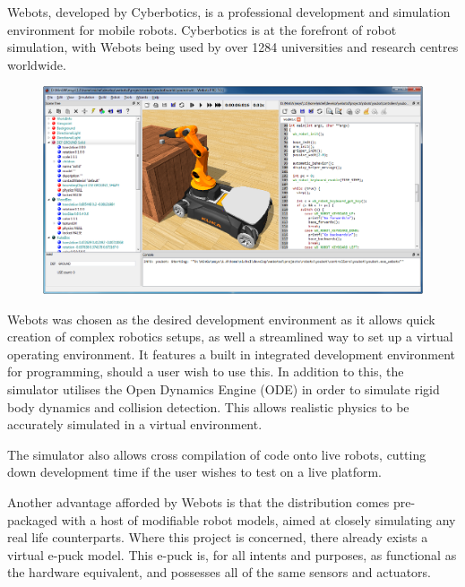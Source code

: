 Webots, developed by Cyberbotics, is a professional development and simulation environment for mobile robots. Cyberbotics is at the forefront of robot simulation, with Webots being used by over 1284 universities and research centres worldwide. \cite{cyberbotics-about}

\begin{figure}[h]
	\begin{minipage}{.75\textwidth}
		\centering
		\includegraphics[width=1.35\linewidth]{webots-screen}
		\label{fig:screen}
	\end{minipage}
\end{figure}

Webots was chosen as the desired development environment as it allows quick creation of complex robotics setups, as well a streamlined way to set up a virtual operating environment. It features a built in integrated development environment for programming, should a user wish to use this. In addition to this, the simulator utilises the Open Dynamics Engine (ODE) in order to simulate rigid body dynamics and collision detection. This allows realistic physics to be accurately simulated in a virtual environment.

The simulator also allows cross compilation of code onto live robots, cutting down development time if the user wishes to test on a live platform.

Another advantage afforded by Webots is that the distribution comes pre-packaged with a host of modifiable robot models, aimed at closely simulating any real life counterparts. Where this project is concerned, there already exists a virtual e-puck model. This e-puck is, for all intents and purposes, as functional as the hardware equivalent, and possesses all of the same sensors and actuators.


